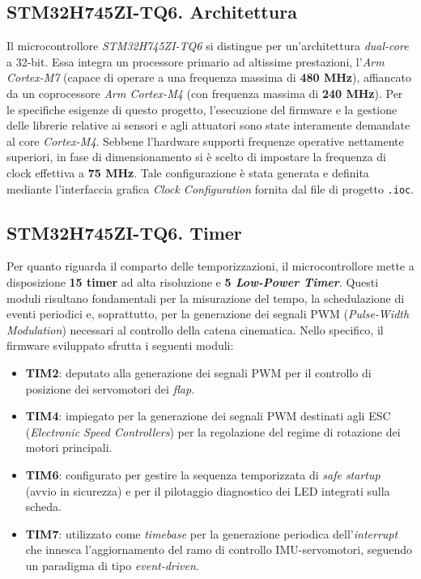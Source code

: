 \documentclass[11pt]{report}
\begin{document}
	\subsection{STM32H745ZI-TQ6. Architettura}
	Il microcontrollore \textit{STM32H745ZI-TQ6} si distingue per un'architettura \textit{dual-core} a 32-bit. Essa integra un processore primario ad altissime prestazioni, l'\textit{Arm Cortex-M7} (capace di operare a una frequenza massima di \textbf{480 MHz}), affiancato da un coprocessore \textit{Arm Cortex-M4} (con frequenza massima di \textbf{240 MHz}). Per le specifiche esigenze di questo progetto, l'esecuzione del firmware e la gestione delle librerie relative ai sensori e agli attuatori sono state interamente demandate al core \textit{Cortex-M4}. Sebbene l'hardware supporti frequenze operative nettamente superiori, in fase di dimensionamento si è scelto di impostare la frequenza di clock effettiva a \textbf{75 MHz}. Tale configurazione è stata generata e definita mediante l'interfaccia grafica \textit{Clock Configuration} fornita dal file di progetto \texttt{.ioc}.
	
	\subsection{STM32H745ZI-TQ6. Timer}
	Per quanto riguarda il comparto delle temporizzazioni, il microcontrollore mette a disposizione \textbf{15 timer} ad alta risoluzione e \textbf{5 \textit{Low-Power Timer}}. Questi moduli risultano fondamentali per la misurazione del tempo, la schedulazione di eventi periodici e, soprattutto, per la generazione dei segnali PWM (\textit{Pulse-Width Modulation}) necessari al controllo della catena cinematica. Nello specifico, il firmware sviluppato sfrutta i seguenti moduli:
	\begin{itemize}
		\item \textbf{TIM2}: deputato alla generazione dei segnali PWM per il controllo di posizione dei servomotori dei \textit{flap}.
		\item \textbf{TIM4}: impiegato per la generazione dei segnali PWM destinati agli ESC (\textit{Electronic Speed Controllers}) per la regolazione del regime di rotazione dei motori principali.
		\item \textbf{TIM6}: configurato per gestire la sequenza temporizzata di \textit{safe startup} (avvio in sicurezza) e per il pilotaggio diagnostico dei LED integrati sulla scheda.
		\item \textbf{TIM7}: utilizzato come \textit{timebase} per la generazione periodica dell'\textit{interrupt} che innesca l'aggiornamento del ramo di controllo IMU-servomotori, seguendo un paradigma di tipo \textit{event-driven}.
	\end{itemize}
	
\end{document}
